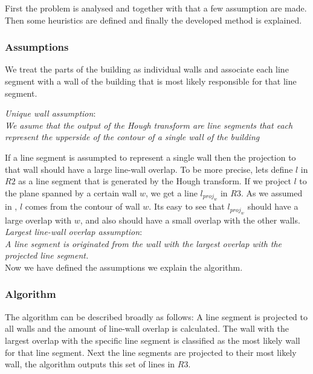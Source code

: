 \documentclass[10pt]{article}
\begin{document}
	First the problem is analysed and together with that a few assumption are made.
	Then some heuristics are defined and finally the developed method is explained.

	\subsubsection{Assumptions}
	We treat the parts of the building as individual walls and associate each
	line segment with a wall of the building that is most likely responsible for
	that line segment. 

	\emph{Unique wall assumption}:\\
	\emph{We asume that the output of the Hough transform are line segments that
	each represent the upperside of the contour of a single wall of the building}



	If a line segment is assumpted to represent a single wall then the
	projection to that wall should have a large line-wall overlap. To be more
	precise, lets define $l$ in $R2$ as a line segment that is generated by the Hough
	transform.  If we project $l$ to the plane spanned by a certain wall $w$, we
	get a line $l_{proj_w}$ in $R3$.  As we assumed in %
	, $l$ comes from the contour of wall $w$. Its easy to see that $l_{proj_w}$
	should have a large overlap with $w$, and also should have a small overlap with
	the other walls.
	\emph{Largest line-wall overlap assumption}:\\
	\emph{A line segment is originated from the wall with the largest overlap
	with the projected line segment.}\\

	Now we have defined the assumptions we explain the algorithm.

	\subsubsection{Algorithm}
	The algorithm can be described broadly as follows:
	A line segment is projected to all walls and the amount of line-wall overlap is
	calculated. The wall with the largest overlap with the specific line
segment is classified as the most likely wall for that line segment.
	Next the line segments are projected to their most likely wall, the
	algorithm outputs this set of lines in $R3$. 
	
\end{document}
